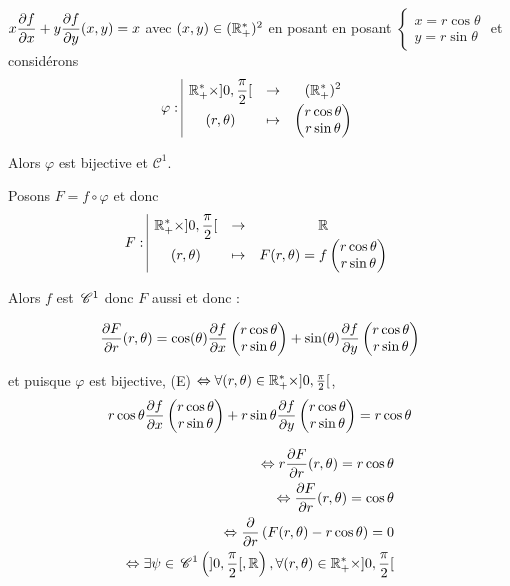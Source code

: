 \begin{exemple}
    $\displaystyle x \frac{\partial f}{\partial x} + y \frac{\partial f}{\partial y} (x, y) = x$ avec $(x, y) \in (\mathbb{R}^*_+)^2$ en posant 
    en posant $\begin{cases}
        x = r \cos \theta \\
        y = r \sin \theta
    \end{cases}$ et considérons 
    $$\varphi: \space \begin{array}{|ccc} \displaystyle \mathbb{R}^*_+ \times ]0, \frac \pi 2 [ & \to & \displaystyle (\mathbb{R}_+^*)^2 \\ \displaystyle (r, \theta) & \mapsto & \displaystyle \begin{pmatrix}
        r \cos \theta \\
        r \sin \theta
    \end{pmatrix} \end{array}$$
    
    Alors $\varphi$ est bijective et $\mathscr C^1$. 

    Posons $F = f \circ \varphi$ et donc $$F: \space \begin{array}{|ccc} \displaystyle \mathbb{R}^*_+ \times ]0, \frac \pi 2 [ & \to & \displaystyle \mathbb{R} \\ \displaystyle (r, \theta) & \mapsto & \displaystyle F(r, \theta) = f\begin{pmatrix}
        r \cos \theta \\
        r \sin \theta
    \end{pmatrix} \end{array}$$

    Alors $f$ est $\,\mathscr C^{1}$ donc $F$ aussi et donc : 

    $$\frac{\partial F}{\partial r} (r, \theta) = \cos( \theta) \frac{\partial f}{\partial x} \begin{pmatrix}
        r \cos \theta \\
        r \sin \theta
    \end{pmatrix} + \sin(\theta) \frac{\partial f}{\partial y} \begin{pmatrix}
        r \cos \theta \\
        r \sin \theta
    \end{pmatrix}$$ 

    et puisque $\varphi$ est bijective, (E) $\Leftrightarrow \forall (r, \theta) \in \mathbb{R}^*_+ \times ]0, \frac \pi 2 [$,
    $$r \cos \theta \frac{\partial f}{\partial x} \begin{pmatrix}
        r \cos \theta \\
        r \sin \theta
    \end{pmatrix} + r \sin \theta \frac{\partial f}{\partial y} \begin{pmatrix}
        r \cos \theta \\
        r \sin \theta
    \end{pmatrix} = r \cos \theta$$

    \begin{align}
        \Leftrightarrow \displaystyle r \frac{\partial F}{\partial r} (r, \theta) = r \cos \theta \\
        \Leftrightarrow \displaystyle \frac{\partial F}{\partial r} (r, \theta) = \cos \theta \\
        \Leftrightarrow \displaystyle \frac{\partial }{\partial r} \left( F(r, \theta) - r \cos \theta \right) = 0 \\
        \Leftrightarrow \displaystyle \exists \psi \in \,\mathscr C^{1} \left( ]0, \frac \pi 2 [, \mathbb{R} \right), \forall (r, \theta) \in \mathbb{R}^*_+ \times ]0, \frac \pi 2 [
    \end{align}


\end{exemple}

